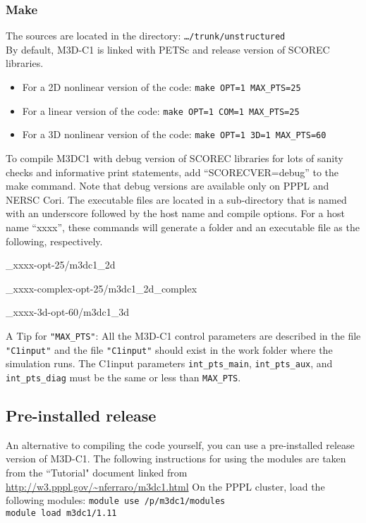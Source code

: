 \subsubsection{Make}
The sources are located in the directory: \texttt{\ldots/trunk/unstructured}
\\
By default, M3D-C1 is linked with PETSc and release version of SCOREC libraries.
\\
\begin{itemize}
\item 	For a 2D nonlinear version of the code: \texttt{make OPT=1 MAX\_PTS=25}
\item	For a linear version of the code:  \texttt{make OPT=1 COM=1 MAX\_PTS=25}
\item	For a 3D nonlinear version of the code: \texttt{make OPT=1 3D=1 MAX\_PTS=60}
\end{itemize}
To compile M3DC1 with debug version of SCOREC libraries for lots of sanity checks and informative print statements, add ``SCORECVER=debug'' to the make command. Note that debug versions are available only on PPPL and NERSC Cori.
\newline\newline
The executable files are located in a sub-directory that is named with an underscore followed by the host name and compile options. For a host name ``xxxx'', these commands will generate a folder and an executable file as the following, respectively.
\begin{description}
\item \_xxxx-opt-25/m3dc1\_2d
\item	\_xxxx-complex-opt-25/m3dc1\_2d\_complex
\item \_xxxx-3d-opt-60/m3dc1\_3d
\end{description}
A Tip for \texttt{"MAX\_PTS"}:  All the M3D-C1 control parameters are described in the file \texttt{"C1input"} and the file \texttt{"C1input"} should exist in the work folder where the simulation runs. The C1input parameters \texttt{int\_pts\_main}, \texttt{int\_pts\_aux}, and \texttt{int\_pts\_diag} must be the same or less than \texttt{MAX\_PTS}.

\subsection{Pre-installed release}
\label{ch:preinstall}
An alternative to compiling the code yourself, you can use a pre-installed release version of M3D-C1.    The following instructions for using the modules are taken from the ``Tutorial" document linked from \href{http://w3.pppl.gov/~nferraro/m3dc1.html}{http://w3.pppl.gov/\~{}nferraro/m3dc1.html}
On the PPPL cluster, load the following modules:
\newline\newline
\texttt{module use /p/m3dc1/modules
\\
module load m3dc1/1.11
}

